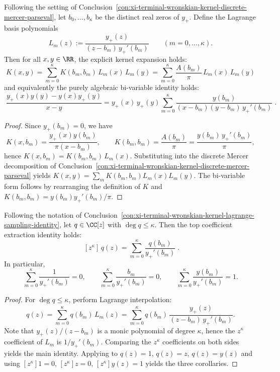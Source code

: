 \begin{conclusion}\label{con:xi-terminal-wronskian-kernel-lagrange-sampling-identity}
Following the setting of Conclusion~\ref{con:xi-terminal-wronskian-kernel-discrete-mercer-parseval}, let \(b_0,\dots,b_\kappa\) be the distinct real zeros of \(y_{+}\).
Define the Lagrange basis polynomials
\[
L_m(z):=\frac{y_{+}(z)}{(z-b_m)\,y_{+}'(b_m)}\qquad (m=0,\dots,\kappa).
\]
Then for all \(x,y\in\RR\), the explicit kernel expansion holds:
\[
\boxed{\;
K(x,y)=\sum_{m=0}^{\kappa}K(b_m,b_m)\,L_m(x)\,L_m(y)
=\sum_{m=0}^{\kappa}\frac{A(b_m)}{\pi}\,L_m(x)\,L_m(y)\;}
\]
and equivalently the purely algebraic bi-variable identity holds:
\[
\boxed{\;
\frac{y_{+}(x)y(y)-y(x)y_{+}(y)}{x-y}
=y_{+}(x)\,y_{+}(y)\sum_{m=0}^{\kappa}\frac{y(b_m)}{(x-b_m)(y-b_m)\,y_{+}'(b_m)}\; }.
\]
\end{conclusion}
\begin{proof}
Since \(y_{+}(b_m)=0\), we have
\[
K(x,b_m)=\frac{y_{+}(x)y(b_m)}{\pi(x-b_m)},
\qquad
K(b_m,b_m)=\frac{A(b_m)}{\pi}=\frac{y(b_m)\,y_{+}'(b_m)}{\pi},
\]
hence \(K(x,b_m)=K(b_m,b_m)\,L_m(x)\).
Substituting into the discrete Mercer decomposition of Conclusion~\ref{con:xi-terminal-wronskian-kernel-discrete-mercer-parseval} yields
\(
K(x,y)=\sum_m K(b_m,b_m)L_m(x)L_m(y)
\).
The bi-variable form follows by rearranging the definition of \(K\) and \(K(b_m,b_m)=y(b_m)y_{+}'(b_m)/\pi\).
\end{proof}

\begin{conclusion}\label{con:xi-terminal-wronskian-top-coefficient-extraction}
Following the notation of Conclusion~\ref{con:xi-terminal-wronskian-kernel-lagrange-sampling-identity}, let \(q\in\CC[z]\) with \(\deg q\le \kappa\).
Then the top coefficient extraction identity holds:
\[
\boxed{\;[z^{\kappa}]\,q(z)=\sum_{m=0}^{\kappa}\frac{q(b_m)}{y_{+}'(b_m)}\; }.
\]
In particular,
\[
\sum_{m=0}^{\kappa}\frac{1}{y_{+}'(b_m)}=0,\qquad
\sum_{m=0}^{\kappa}\frac{b_m}{y_{+}'(b_m)}=0,\qquad
\sum_{m=0}^{\kappa}\frac{y(b_m)}{y_{+}'(b_m)}=1.
\]
\end{conclusion}
\begin{proof}
For \(\deg q\le\kappa\), perform Lagrange interpolation:
\[
q(z)=\sum_{m=0}^{\kappa} q(b_m)\,L_m(z)
=\sum_{m=0}^{\kappa}q(b_m)\,\frac{y_{+}(z)}{(z-b_m)\,y_{+}'(b_m)}.
\]
Note that \(y_{+}(z)/(z-b_m)\) is a monic polynomial of degree \(\kappa\), hence the \(z^\kappa\) coefficient of \(L_m\) is \(1/y_{+}'(b_m)\).
Comparing the \(z^\kappa\) coefficients on both sides yields the main identity.
Applying to \(q(z)=1\), \(q(z)=z\), \(q(z)=y(z)\) and using \([z^\kappa]1=0\), \([z^\kappa]z=0\), \([z^\kappa]y(z)=1\) yields the three corollaries.
\end{proof}

\endinput


